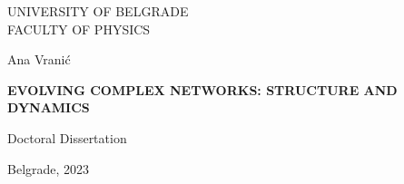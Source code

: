 \thispagestyle{empty}
\centering

\Large{
    UNIVERSITY OF BELGRADE \\
    FACULTY OF PHYSICS
}

\vspace{5.5cm}

\Large{
    Ana Vrani\' c
}

\vspace{.5cm}


\textbf{\LARGE 
  { EVOLVING COMPLEX NETWORKS: STRUCTURE AND DYNAMICS}
  }

\vspace{.5cm}

\Large{
    Doctoral Dissertation }

    \vspace{9.1cm}

\Large{
    Belgrade, 2023
}

\pagebreak
\justify

